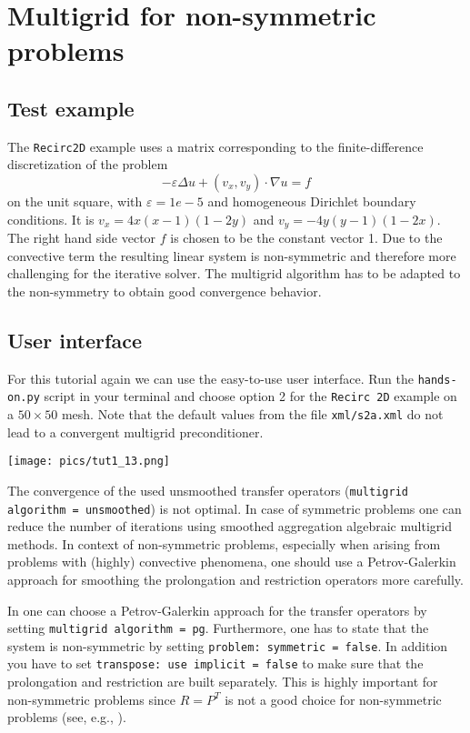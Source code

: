 \documentclass[10pt,fleqn]{book}
\begin{document}
\chapter{Multigrid for non-symmetric problems}

\section{Test example}
\label{sec:recircexample}
The \texttt{Recirc2D} example uses a matrix corresponding to the finite-difference discretization of the problem
\begin{displaymath}
-\varepsilon\Delta u + (v_x,v_y)\cdot \nabla u=f
\end{displaymath}
on the unit square, with $\varepsilon=1e-5$ and homogeneous Dirichlet boundary conditions. It is $v_x=4x(x-1)(1-2y)$ and $v_y=-4y(y-1)(1-2x)$.
The right hand side vector $f$ is chosen to be the constant vector 1. Due to the convective term the resulting linear system is non-symmetric and therefore more challenging for the iterative solver. The multigrid algorithm has to be adapted to the non-symmetry to obtain good convergence behavior.

\section{User interface}

For this tutorial again we can use the easy-to-use user interface. Run the \texttt{hands-on.py} script in your terminal and choose option 2 for the \texttt{Recirc 2D} example on a $50\times 50$ mesh.
Note that the default values from the file \texttt{xml/s2a.xml} do not lead to a convergent multigrid preconditioner.
\begin{center}\texttt{[image: pics/tut1\_13.png]} \end{center}

The convergence of the used unsmoothed transfer operators (\texttt{multigrid algorithm = unsmoothed}) is not optimal. In case of symmetric problems one can reduce the number of iterations using smoothed aggregation algebraic multigrid methods. In context of non-symmetric problems, especially when arising from problems with (highly) convective phenomena, one should use a Petrov-Galerkin approach for smoothing the prolongation and restriction operators more carefully.

In \muelu one can choose a Petrov-Galerkin approach for the transfer operators by setting \texttt{multigrid algorithm = pg}. Furthermore, one has to state that the system is non-symmetric by setting \texttt{problem: symmetric = false}. In addition you have to set \texttt{transpose: use implicit = false} to make sure that the prolongation and restriction are built separately. This is highly important for non-symmetric problems since $R=P^T$ is not a good choice for non-symmetric problems (see, e.g., \cite{sala2008,wiesner2013}).
\end{document}

